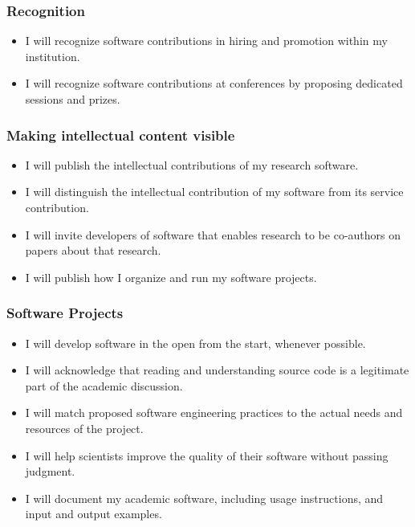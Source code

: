 \documentclass[a4paper,UKenglish]{dagman}
\renewcommand{\paragraph}[1]{\subsubsection*{#1}\xspace}
\begin{document}
\paragraph{Recognition}
\begin{itemize}
\item I will recognize software contributions in hiring and promotion within my institution.
\item I will recognize software contributions at conferences by proposing dedicated sessions and prizes.
\end{itemize}

\paragraph{Making intellectual content visible}
\begin{itemize}
\item I will publish the intellectual contributions of my research software.
\item I will distinguish the intellectual contribution of my software from its service contribution.
\item I will invite developers of software that enables research to be co-authors on papers about that research.
\item I will publish how I organize and run my software projects.
\end{itemize}

\paragraph{Software Projects}
\begin{itemize}
\item I will develop software in the open from the start, whenever possible.
\item I will acknowledge that reading and understanding source code is a legitimate part of the academic discussion.
\item I will match proposed software engineering practices to the actual needs and resources of the project.
\item I will help scientists improve the quality of their software without passing judgment.
\item I will document my academic software, including usage instructions, and input and output examples.
\end{itemize}
\end{document}
